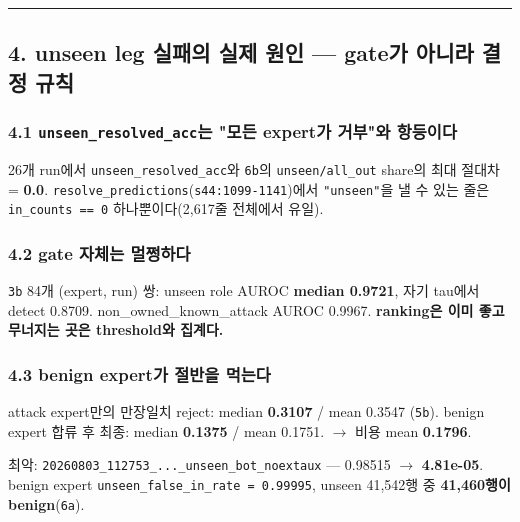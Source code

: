\medskip\hrule\medskip
\subsection{4. unseen leg 실패의 실제 원인 — gate가 아니라 결정 규칙}
\subsubsection{4.1 \texttt{unseen\_\allowbreak{}\allowbreak{}r\allowbreak{}esolved\_\allowbreak{}\allowbreak{}acc}는 "모든 expert가 거부"와 항등이다}
26개 run에서 \texttt{unseen\_\allowbreak{}\allowbreak{}r\allowbreak{}esolved\_\allowbreak{}\allowbreak{}acc}와 \texttt{6b}의 \texttt{unseen/\allowbreak{}\allowbreak{}a\allowbreak{}ll\_\allowbreak{}\allowbreak{}out} share의 최대 절대차 =\allowbreak{} \textbf{0.0}. \texttt{resolve\_\allowbreak{}\allowbreak{}predicti\allowbreak{}ons}(\texttt{s44:1099\allowbreak{}-\allowbreak{}1141})에서 \texttt{"unseen"\allowbreak{}}을 낼 수 있는 줄은 \texttt{in\_\allowbreak{}\allowbreak{}count\allowbreak{}s =\allowbreak{}\allowbreak{}=\allowbreak{}\allowbreak{} 0} 하나뿐이다(2,617줄 전체에서 유일).

\subsubsection{4.2 gate 자체는 멀쩡하다}
\texttt{3b} 84개 (expert, run) 쌍: unseen role AUROC \textbf{median 0.9721}, 자기 tau에서 detect 0.8709. non\_\allowbreak{}owned\_\allowbreak{}known\_\allowbreak{}attack AUROC 0.9967. \textbf{ranking은 이미 좋고 무너지는 곳은 threshold와 집계다.}

\subsubsection{4.3 benign expert가 절반을 먹는다}
attack expert만의 만장일치 reject: median \textbf{0.3107} /\allowbreak{} mean 0.3547 (\texttt{5b}). benign expert 합류 후 최종: median \textbf{0.1375} /\allowbreak{} mean 0.1751.  \ensuremath{\rightarrow}  비용 mean \textbf{0.1796}.

최악: \texttt{20260803\allowbreak{}\_\allowbreak{}\allowbreak{}112753\_\allowbreak{}\allowbreak{}.\allowbreak{}.\allowbreak{}.\allowbreak{}\_\allowbreak{}\allowbreak{}unse\allowbreak{}en\_\allowbreak{}\allowbreak{}bot\_\allowbreak{}\allowbreak{}n\allowbreak{}oextaux} — 0.98515  \ensuremath{\rightarrow}  \textbf{4.81e-05}. benign expert \texttt{unseen\_\allowbreak{}\allowbreak{}f\allowbreak{}alse\_\allowbreak{}\allowbreak{}in\_\allowbreak{}\allowbreak{}rate =\allowbreak{}\allowbreak{} 0\allowbreak{}.\allowbreak{}99995}, unseen 41,542행 중 \textbf{41,460행이 benign}(\texttt{6a}).

